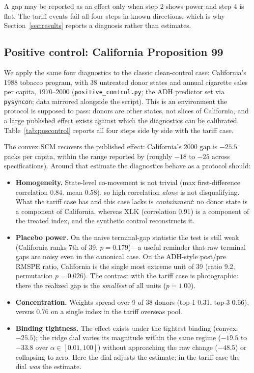 \documentclass[11pt,a4paper]{article}
\begin{document}
A gap may be reported as an effect only when step 2 shows power and step 4
is flat. The tariff events fail all four steps in known directions, which
is why Section~\ref{sec:results} reports a diagnosis rather than
estimates.

\subsection{Positive control: California Proposition 99}\label{sec:poscontrol}

We apply the same four diagnostics to the classic clean-control case:
California's 1988 tobacco program, with 38 untreated donor states and
annual cigarette sales per capita, 1970--2000
(\texttt{positive\_control.py}; the ADH predictor set via \texttt{pysyncon};
data mirrored alongside the script). This is an environment the protocol
is supposed to pass: donors are other states, not slices of California,
and a large published effect exists against which the diagnostics can be
calibrated. Table~\ref{tab:poscontrol} reports all four steps side by
side with the tariff case.

The convex SCM recovers the published effect: California's 2000 gap is
$-25.5$ packs per capita, within the range reported by \citet{abadie2010}
(roughly $-18$ to $-25$ across specifications). Around that estimate the
diagnostics behave as a protocol should:

\begin{itemize}
  \item \textbf{Homogeneity.} State-level co-movement is not trivial
  (max first-difference correlation 0.84, mean 0.58), so high correlation
  \emph{alone} is not disqualifying. What the tariff case has and this
  case lacks is \emph{containment}: no donor state is a component of
  California, whereas XLK (correlation 0.91) is a component of the
  treated index, and the synthetic control reconstructs it.
  \item \textbf{Placebo power.} On the naive terminal-gap statistic the
  test is still weak (California ranks 7th of 39, $p=0.179$)---a useful
  reminder that raw terminal gaps are noisy even in the canonical case.
  On the ADH-style post/pre RMSPE ratio, California is the single most
  extreme unit of 39 (ratio 9.2, permutation $p=0.026$). The contrast
  with the tariff case is photographic: there the realized gap is the
  \emph{smallest} of all units ($p=1.00$).
  \item \textbf{Concentration.} Weights spread over 9 of 38 donors
  (top-1 0.31, top-3 0.66), versus 0.76 on a single index in the tariff
  overseas pool.
  \item \textbf{Binding tightness.} The effect exists under the tightest
  binding (convex: $-25.5$); the ridge dial varies its magnitude within
  the same regime ($-19.5$ to $-33.8$ over $\alpha\in[0.01,100]$)
  without approaching the raw change ($-48.5$) or collapsing to zero.
  Here the dial adjusts the estimate; in the tariff case the dial
  \emph{was} the estimate.
\end{itemize}
\end{document}
